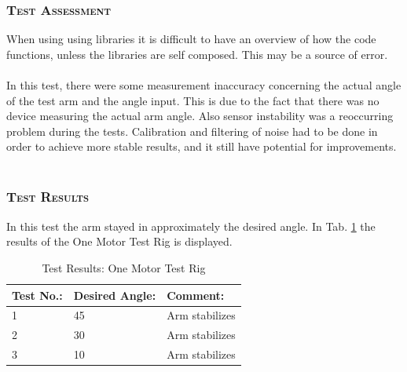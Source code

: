 \subsubsection*{\textsc{\medium Test Assessment}}
When using using libraries it is difficult to have an overview of how the code functions, unless the libraries are self composed. This may be a source of error.
\\\\
In this test, there were some measurement inaccuracy concerning the actual angle of the test arm and the angle input. This is due to the fact that there was no device measuring the actual arm angle. Also sensor instability was a reoccurring problem during the tests. Calibration and filtering of noise had to be done in order to achieve more stable results, and it still have potential for improvements.
\\\\

\subsubsection*{\textsc{\medium Test Results}}
In this test the arm stayed in approximately the desired angle. In Tab. \ref{tab:tabt3} the results of the One Motor Test Rig is displayed. 
\begin {table}[H]
    \begin{center}
    \caption {Test Results: One Motor Test Rig} 
    \label{tab:tabt3} 
    \begin{tabular}{|l|l|l|}\hline 
        Test No.:  & Desired Angle:   & Comment:\\ \hline
        1         & 45    &  Arm stabilizes   \\ \hline
        2         & 30    &  Arm stabilizes    \\ \hline
        3         & 10    &  Arm stabilizes    \\ \hline
    \end{tabular}
    \end{center}
\end{table}
\newpage

